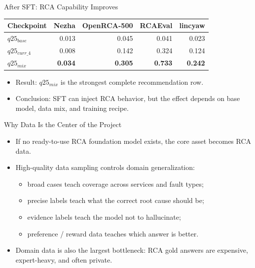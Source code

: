 \begin{frame}{After SFT: RCA Capability Improves}
  \tiny
  \begin{table}
    \begin{tabular}{lrrrr}
      \toprule
      Checkpoint & Nezha & OpenRCA-500 & RCAEval & lincyaw \\
      \midrule
      $q25_{base}$ & 0.013 & 0.045 & 0.041 & 0.023 \\
      $q25_{curr\_4}$ & 0.008 & 0.142 & 0.324 & 0.124 \\
      $q25_{mix}$ & \textbf{0.034} & \textbf{0.305} & \textbf{0.733} & \textbf{0.242} \\
      \bottomrule
    \end{tabular}
  \end{table}
  \normalsize
  \begin{itemize}
    \item Result: $q25_{mix}$ is the strongest complete recommendation row.
    \item Conclusion: SFT can inject RCA behavior, but the effect depends on
      base model, data mix, and training recipe.
  \end{itemize}
\end{frame}

\begin{frame}{Why Data Is the Center of the Project}
  \begin{itemize}
    \item If no ready-to-use RCA foundation model exists, the core asset becomes
      RCA data.
    \item High-quality data sampling controls domain generalization:
      \begin{itemize}
        \item broad cases teach coverage across services and fault types;
        \item precise labels teach what the correct root cause should be;
        \item evidence labels teach the model not to hallucinate;
        \item preference / reward data teaches which answer is better.
      \end{itemize}
    \item Domain data is also the largest bottleneck: RCA gold answers are
      expensive, expert-heavy, and often private.
  \end{itemize}
\end{frame}

